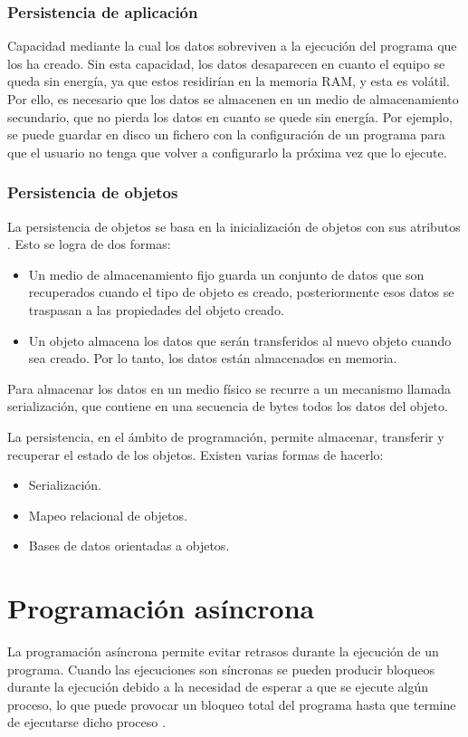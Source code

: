 \subsubsection{Persistencia de aplicación}
Capacidad mediante la cual los datos sobreviven a la ejecución del programa que los ha creado. Sin esta capacidad, los datos desaparecen en cuanto el equipo se queda sin energía, ya que estos residirían en la memoria RAM, y esta es volátil. Por ello, es necesario que los datos se almacenen en un medio de almacenamiento secundario, que no pierda los datos en cuanto se quede sin energía. Por ejemplo, se puede guardar en disco un fichero con la configuración de un programa para que el usuario no tenga que volver a configurarlo la próxima vez que lo ejecute.

\subsubsection{Persistencia de objetos}
La persistencia de objetos se basa en la inicialización de objetos con sus atributos \cite{persistencia}. Esto se logra de dos formas:
\begin{itemize}
    \item Un medio de almacenamiento fijo guarda un conjunto de datos que son recuperados cuando el tipo de objeto es creado, posteriormente esos datos se traspasan a las propiedades del objeto creado.
    \item Un objeto almacena los datos que serán transferidos al nuevo objeto cuando sea creado. Por lo tanto, los datos están almacenados en memoria.
\end{itemize}

Para almacenar los datos en un medio físico se recurre a un mecanismo llamada serialización, que contiene en una secuencia de bytes todos los datos del objeto.

La persistencia, en el ámbito de programación, permite almacenar, transferir y recuperar el estado de los objetos. Existen varias formas de hacerlo:
\begin{itemize}
    \item Serialización.
    \item Mapeo relacional de objetos.
    \item Bases de datos orientadas a objetos.
\end{itemize}

\section{Programación asíncrona}
La programación asíncrona permite evitar retrasos durante la ejecución de un programa. Cuando las ejecuciones son síncronas se pueden producir bloqueos durante la ejecución debido a la necesidad de esperar a que se ejecute algún proceso, lo que puede provocar un bloqueo total del programa hasta que termine de ejecutarse dicho proceso \cite{asincrona_softplan}.


